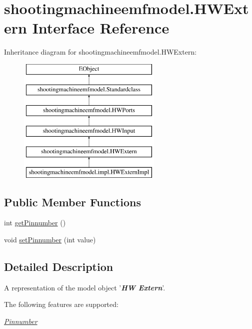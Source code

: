 \hypertarget{interfaceshootingmachineemfmodel_1_1_h_w_extern}{\section{shootingmachineemfmodel.\-H\-W\-Extern Interface Reference}
\label{interfaceshootingmachineemfmodel_1_1_h_w_extern}
}
Inheritance diagram for shootingmachineemfmodel.\-H\-W\-Extern\-:\begin{figure}[H]
\begin{center}
\leavevmode
\includegraphics[height=6.000000cm]{interfaceshootingmachineemfmodel_1_1_h_w_extern}
\end{center}
\end{figure}
\subsection*{Public Member Functions}
\begin{DoxyCompactItemize}
\item 
int \hyperlink{interfaceshootingmachineemfmodel_1_1_h_w_extern_aa662a4efd78924b1162339431160a014}{get\-Pinnumber} ()
\item 
void \hyperlink{interfaceshootingmachineemfmodel_1_1_h_w_extern_aaee7f7e8ff2341375bae1ffe45dd0624}{set\-Pinnumber} (int value)
\end{DoxyCompactItemize}


\subsection{Detailed Description}
A representation of the model object '{\itshape {\bfseries H\-W Extern}}'.

The following features are supported\-: 
\begin{DoxyItemize}
\item \hyperlink{interfaceshootingmachineemfmodel_1_1_h_w_extern_aa662a4efd78924b1162339431160a014}{{\itshape Pinnumber}} 
\end{DoxyItemize}

